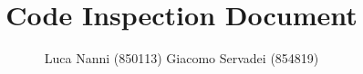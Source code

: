 \documentclass[a4paper]{article}
\begin{document}
\title{\textbf{C}ode \textbf{I}nspection \textbf{D}ocument}
\author{Luca Nanni (850113) \linebreak
	Giacomo Servadei (854819)}
\maketitle
\tableofcontents





\end{document}

